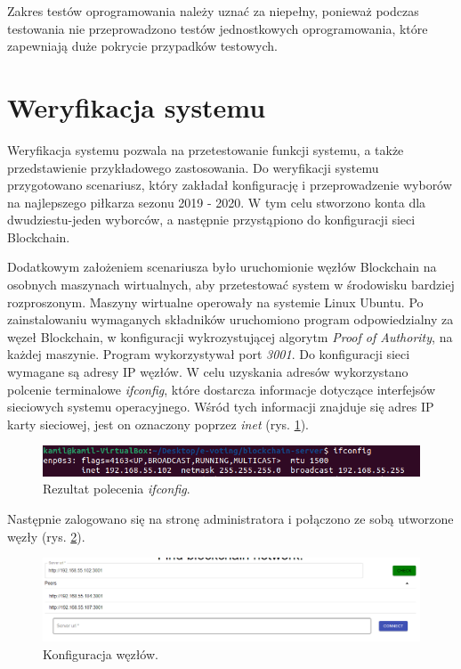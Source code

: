 \documentclass[a4paper,12pt]{book}
\begin{document}
Zakres testów oprogramowania należy uznać za niepełny, ponieważ podczas testowania nie przeprowadzono testów jednostkowych oprogramowania, które zapewniają duże pokrycie przypadków testowych.

\section{Weryfikacja systemu}

Weryfikacja systemu pozwala na przetestowanie funkcji systemu, a także przedstawienie przykładowego zastosowania.
Do weryfikacji systemu przygotowano scenariusz, który zakładał konfigurację i przeprowadzenie wyborów na najlepszego piłkarza sezonu 2019 - 2020.
W tym celu stworzono konta dla dwudziestu-jeden wyborców, a następnie przystąpiono do konfiguracji sieci Blockchain.

Dodatkowym założeniem scenariusza było uruchomionie węzłów Blockchain na osobnych maszynach wirtualnych, aby przetestować system w środowisku bardziej rozproszonym.
Maszyny wirtualne operowały na systemie Linux Ubuntu. Po zainstalowaniu wymaganych składników uruchomiono program odpowiedzialny za węzeł Blockchain, w konfiguracji wykrozystującej algorytm \textit{Proof of Authority}, na każdej maszynie.
Program wykorzystywał port \textit{3001}. Do konfiguracji sieci wymagane są adresy IP węzłów. W celu uzyskania adresów wykorzystano polcenie terminalowe \textit{ifconfig}, które dostarcza informacje dotyczące interfejsów sieciowych 
systemu operacyjnego. Wśród tych informacji znajduje się adres IP karty sieciowej, jest on oznaczony poprzez \textit{inet} (rys. \ref{ifconfig}). 

\begin{figure}[H]
  \centering
\includegraphics[width=\textwidth]{images/ifconfig.png}
\caption{Rezultat polecenia \textit{ifconfig}.}\label{ifconfig}
\end {figure}

Następnie zalogowano się na stronę administratora i połączono ze sobą utworzone węzły (rys. \ref{KonfiguracjaSieci}).

\begin{figure}[H]
  \centering
\includegraphics[width=\textwidth]{images/KonfiguracjaSieci.png}
\caption{Konfiguracja węzłów.}\label{KonfiguracjaSieci}
\end {figure}
\end{document}
